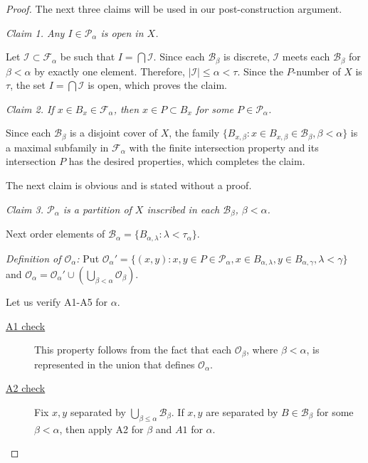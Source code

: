 \documentclass[12pt]{amsart}
\begin{document}
\begin{proof}
\par\medskip\noindent
The next three claims will be used in our post-construction argument.

\par\bigskip\noindent
{\it Claim 1. Any $I\in  \mathcal P_\alpha$ is open in $X$.}
\par\smallskip\noindent
Let $\mathcal I\subset \mathcal F_\alpha$ be such that $I=\bigcap \mathcal I$. Since each $\mathcal B_\beta$ is discrete, $\mathcal I$ meets each $\mathcal B_\beta$ for $\beta<\alpha$ by exactly one element. Therefore, $|\mathcal I|\leq \alpha<\tau$. Since the $P$-number of $X$ is $\tau$, the set $I=\bigcap \mathcal I$ is open, which proves the claim.

\par\bigskip\noindent
{\it Claim 2. If $x\in B_x\in \mathcal F_\alpha$, then $x\in P\subset B_x$ for some $P\in \mathcal P_\alpha$.}
\par\smallskip\noindent
Since each $\mathcal B_\beta$ is a disjoint cover of $X$, the family $\{B_{x,\beta}:x\in B_{x,\beta}\in \mathcal B_\beta, \beta<\alpha\}$ is a maximal subfamily in $\mathcal F_\alpha$ with the finite intersection property and its intersection $P$ has the desired properties, which completes the claim.

\par\bigskip\noindent
The next claim is obvious and is stated without a proof.
\par\bigskip\noindent
{\it Claim 3. $\mathcal P_\alpha$ is a partition of $X$ inscribed in each $\mathcal B_\beta$, $\beta<\alpha$.}
\par\smallskip\noindent
 
\par\bigskip\noindent
Next order elements of $\mathcal B_\alpha = \{B_{\alpha,\lambda}:\lambda<\tau_\alpha\}$.
\par\medskip\noindent
{\it Definition of $\mathcal O_\alpha$:} 
Put  $\mathcal O_\alpha'=\{(x,y):x,y\in P\in \mathcal P_\alpha, x\in B_{\alpha,\lambda}, y\in B_{\alpha,\gamma},\lambda<\gamma\}$ and
$\mathcal O_\alpha = \mathcal O_\alpha'\cup (\bigcup_{\beta<\alpha}\mathcal O_\beta).$

\par\medskip\noindent
Let us verify A1-A5 for $\alpha$.

\par\bigskip\noindent
\begin{description}
	\item[\underline{\rm A1 check}] This property follows from the fact that each $\mathcal O_\beta$, where $\beta<\alpha$, is represented in the union that defines $\mathcal O_\alpha$.
	\item[\underline{\rm A2 check}] Fix $x,y$ separated by $\bigcup_{\beta\leq \alpha}\mathcal B_\beta$. If $x,y$ are separated by $B\in \mathcal B_\beta$ for some $\beta<\alpha$, then apply A2 for $\beta$ and $A1$ for $\alpha$.


\end{description}
\end{proof}
\end{document}
